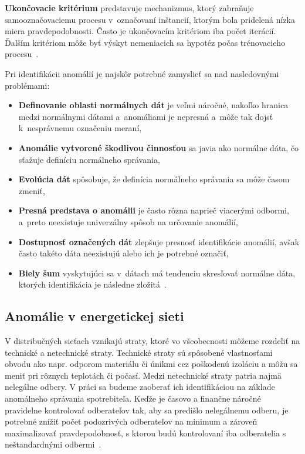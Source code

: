 \documentclass[a4paper,twoside,slovak,12pt]{article}
\begin{document}
\textbf{Ukončovacie kritérium} predstavuje mechanizmus, ktorý zabraňuje
samooznačovaciemu procesu v~označovaní inštancií, ktorým bola pridelená nízka
miera pravdepodobnosti. Často je ukončovacím kritériom iba počet iterácií.
Ďalším kritériom môže byť výskyt nemeniacich sa hypotéz počas trénovacieho
procesu~\cite{Gonzalez2017}.

Pri identifikácii anomálií je najskôr potrebné zamyslieť sa nad nasledovnými
problémami:

\begin{itemize}[noitemsep]
\item \textbf{Definovanie oblasti normálnych dát} je veľmi náročné, nakoľko
hranica medzi normálnymi dátami a~anomáliami je nepresná a~môže tak dojsť
k~nesprávnemu označeniu meraní,
\item \textbf{Anomálie vytvorené škodlivou činnosťou} sa javia ako normálne dáta,
čo sťažuje definíciu normálneho správania,
\item \textbf{Evolúcia dát} spôsobuje, že definícia normálneho správania sa môže
časom zmeniť,
\item \textbf{Presná predstava o anomálii} je často rôzna naprieč viacerými
odbormi, a~preto neexistuje univerzálny spôsob na určovanie anomálií,
\item \textbf{Dostupnosť označených dát} zlepšuje presnosť identifikácie anomálií,
avšak často takéto dáta neexistujú alebo ich je potrebné označiť,
\item \textbf{Biely šum} vyskytujúci sa v~dátach má tendenciu skresľovať
normálne dáta, ktorých identifikácia je následne zložitá~\cite{Chandola2009}.
\end{itemize}

\subsection{Anomálie v energetickej sieti}
V distribučných sieťach vznikajú straty, ktoré vo všeobecnosti môžeme rozdeliť
na technické a netechnické straty. Technické straty sú spôsobené vlastnosťami
obvodu ako napr. odporom materiálu či únikmi cez poškodenú izoláciu a môžu sa
meniť pri rôznych teplotách či počasí. Medzi netechnické straty patria najmä
nelegálne odbery. V práci sa budeme zaoberať ich identifikáciou na základe
anomálneho správania spotrebiteľa. Keďže je časovo a finančne náročné
pravidelne kontrolovať odberateľov tak, aby sa predišlo nelegálnemu odberu,
je potrebné znížiť počet podozrivých odberateľov na minimum a zároveň
maximalizovať pravdepodobnosť, s ktorou budú kontrolovaní iba odberatelia
s neštandardnými odbermi~\cite{Coma-Puig2016,Sahoo2015}.
\end{document}
